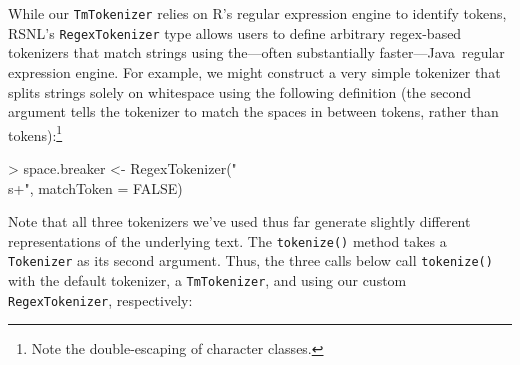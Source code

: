 \documentclass[11pt]{article}
\def\R{\textsf{R}}
\def\Java{\textsf{Java}}
\def\RSNL{{\normalfont\fontseries{b}\selectfont RSNL}}
\let\code=\texttt
\let\rclass=\texttt
\begin{document}
While our \rclass{TmTokenizer} relies on \R's regular expression
engine to identify tokens, \RSNL's \rclass{RegexTokenizer} type allows
users to define arbitrary regex-based tokenizers that match strings
using the---often substantially faster---\Java\ regular expression
engine.  For example, we might construct a very simple tokenizer that
splits strings solely on whitespace using the following
definition (the second argument tells the tokenizer to match the
spaces in between tokens, rather than tokens):\footnote{Note the
double-escaping of character classes.}
\begin{Schunk}
\begin{Sinput}
> space.breaker <- RegexTokenizer("\\s+", matchToken = FALSE)
\end{Sinput}
\end{Schunk}
Note that all three tokenizers we've used thus far generate slightly
different representations of the underlying text.  The
\code{tokenize()} method takes a \rclass{Tokenizer} as its second
argument.  Thus, the three calls below call \code{tokenize()} with the
default tokenizer, a \rclass{TmTokenizer}, and using our custom
\rclass{RegexTokenizer}, respectively:
\end{document}
